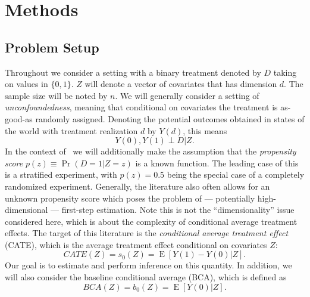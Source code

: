 \documentclass[11pt, a4paper, leqno]{article}
\DeclareMathOperator{\E}{E}
\begin{document}
\section{Methods}

\subsection{Problem Setup}
Throughout we consider a setting with a binary treatment denoted by $D$ taking on values in $\{0, 1\}$.
$Z$ will denote a vector of covariates that has dimension $d$. The sample size will be noted by $n$.
We will generally consider a setting of \textit{unconfoundedness}, meaning that conditional on covariates the treatment is as-good-as randomly assigned.
Denoting the potential outcomes obtained in states of the world with treatment realization $d$ by $Y(d)$, this means
\begin{equation*}
    Y(0), Y(1) \perp D | Z.
\end{equation*}
In the context of~\citet{chernozhukov2023genml} we will additionally make the assumption that the \textit{propensity score} $p(z) \equiv \Pr(D=1|Z=z)$ is a known function.
The leading case of this is a stratified experiment, with $p(z) = 0.5$ being the special case of a completely randomized experiment.
Generally, the literature also often allows for an unknown propensity score which poses the problem of --- potentially high-dimensional --- first-step estimation.
Note this is not the ``dimensionality'' issue considered here, which is about the complexity of conditional average treatment effects.
The target of this literature is the \textit{conditional average treatment effect} (CATE), which is the average treatment effect conditional on covariates $Z$:
\begin{equation*}
    CATE(Z) = s_0(Z) = \E[Y(1) - Y(0)|Z].
\end{equation*}
Our goal is to estimate and perform inference on this quantity.
In addition, we will also consider the baseline conditional average (BCA), which is defined as
\begin{equation*}
    BCA(Z) = b_0(Z) = \E[Y(0)|Z].
\end{equation*}
\end{document}
